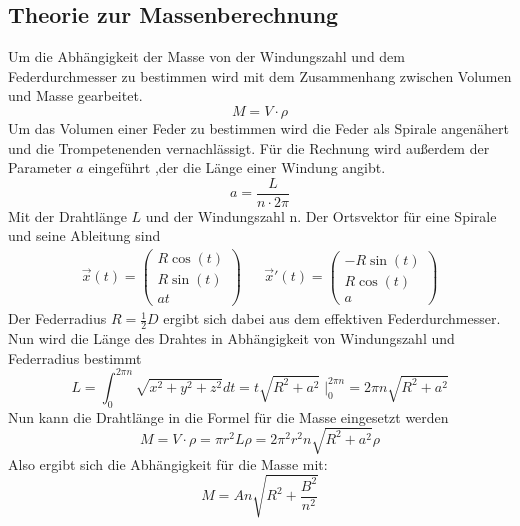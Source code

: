 \subsection{Theorie zur Massenberechnung}
Um die Abhängigkeit der Masse von der Windungszahl und dem Federdurchmesser zu bestimmen wird mit dem Zusammenhang zwischen Volumen und Masse gearbeitet.
\begin{equation}
    M = V \cdot \rho
\end{equation}
Um das Volumen einer Feder zu bestimmen wird die Feder als Spirale angenähert und die Trompetenenden vernachlässigt.
Für die Rechnung wird außerdem der Parameter $a$ eingeführt ,der die Länge einer Windung angibt.
\begin{equation}
    a = \frac{L}{n\cdot 2\pi}
\end{equation}
Mit der Drahtlänge $L$ und der Windungszahl n.
Der Ortsvektor für eine Spirale und seine Ableitung sind
\begin{align}
    \vec{x}(t) = \left(\begin{array}{c} R\cos(t) \\ R\sin(t) \\ at\end{array}\right) && \vec{x}'(t) = \left(\begin{array}{c} -R\sin(t) \\ R\cos(t) \\ a \end{array}\right)
\end{align}
Der Federradius $R = \frac{1}{2} D$ ergibt sich dabei aus dem effektiven Federdurchmesser.
Nun wird die Länge des Drahtes in Abhängigkeit von Windungszahl und Federradius bestimmt
\begin{equation}
    L = \int_{0}^{2\pi n} \sqrt{x^2+y^2+z^2}dt = t \sqrt{R^2+a^2} \; |_{0}^{2\pi n} = 2\pi n \sqrt{R^2+a^2}
\end{equation}
Nun kann die Drahtlänge in die Formel für die Masse eingesetzt werden
\begin{equation}
    M = V\cdot \rho = \pi r^2 L \rho = 2 \pi^2 r^2 n \sqrt{R^2 + a^2} \rho
\end{equation}
Also ergibt sich die Abhängigkeit für die Masse mit:
\begin{equation}
    M = An \sqrt{R^2 + \frac{B^2}{n^2}}
\end{equation}
\label{sec:theorie}